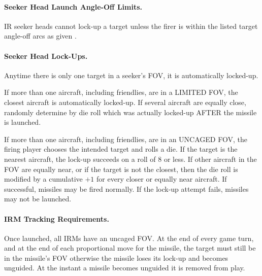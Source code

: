 

\paragraph{Seeker Head Launch Angle-Off Limits.} IR seeker heads cannot lock-up a target unless the firer is within the listed target angle-off arcs as given .


\paragraph{Seeker Head Lock-Ups.} Anytime there is only one target in a seeker's FOV, it is automatically locked-up.

If more than one aircraft, including friendlies, are in a LIMITED FOV, the closest aircraft is automatically locked-up. If several aircraft are equally close, randomly determine by die roll which was actually locked-up AFTER the missile is launched.

If more than one aircraft, including friendlies, are in an UNCAGED FOV, the firing player chooses the intended target and rolls a die. If the target is the nearest aircraft, the lock-up succeeds on a roll of 8 or less. If other aircraft in the FOV are equally near, or if the target is not the closest, then the die roll is modified by a cumulative $+1$ for every closer or equally near aircraft. If successful, missiles may be fired normally. If the lock-up attempt fails, missiles may not be launched.


\paragraph{IRM Tracking Requirements.} Once launched, all IRMs have an uncaged FOV. At the end of every game turn, and at the end of each proportional move for the missile, the target must still be in the missile's FOV otherwise the missile loses its lock-up and becomes unguided. At the instant a missile becomes unguided it is removed from play.

